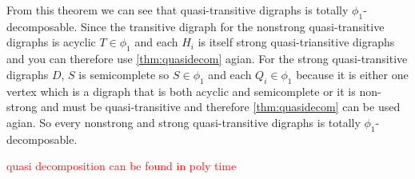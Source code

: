 From this theorem we can see that quasi-transitive digraphs is totally $\phi_1$-decomposable. 
Since the transitive digraph for the nonstrong quasi-transitive digraphs is acyclic $T\in \phi_1$ and each $H_i$ is itself strong quasi-triansitive digraphs and you can therefore use \autoref{thm:quasidecom} agian.  
For the strong quasi-transitive digraphs $D$, $S$ is semicomplete so $S\in \phi_1$ and each $Q_i \in \phi_1$ because it is either one vertex which is a digraph that is both acyclic and semicomplete or it is non-strong and must be quasi-transitive and therefore \autoref{thm:quasidecom} can be used agian. So every nonstrong and strong quasi-transitive digraphs is totally $\phi_1$-decomposable.

\begin{thm}
    \textcolor{red}{quasi decomposition can be found in poly time}
\end{thm}
